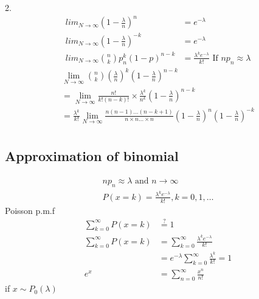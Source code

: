 \documentclass{article}
\begin{document}
2.
\begin{align*}
    lim  _{N \rightarrow \infty} (1-\frac{\lambda}{n}) ^{n}
     & = e ^{-\lambda}                                                           \\
    lim  _{N \rightarrow \infty} (1-\frac{\lambda}{n}) ^{-k}
     & = e ^{-\lambda}                                                           \\
    lim  _{N \rightarrow \infty} \binom{n}{k} p _{n}^{k} (1-p) ^{n-k}
     & = \frac{\lambda ^{k} e ^{- \lambda}}{k!} \text{ If } np_n \approx \lambda
\end{align*}
\begin{gather*}
    \lim _{N \rightarrow \infty} \binom{n}{k} (\frac{\lambda}{n}) ^k (1-\frac{\lambda}{n}) ^{n-k} \\
    =
    \lim _{N \rightarrow \infty} \frac{n!}{k!(n-k)!} \times   \frac{\lambda^k}{n^k} (1-\frac{\lambda}{n}) ^{n-k} \\
    =
    \frac{\lambda^k}{k!} \lim _{N \rightarrow \infty} \frac{n(n-1) \dots (n-k+1)}{n \times n \dots \times n} (1-\frac{\lambda}{n}) ^n (1-\frac{\lambda}{n}) ^{-k} \\
\end{gather*}

\subsection{Approximation of binomial}
\begin{gather*}
    np_n \approx \lambda \text{ and } n \rightarrow \infty \\
    P(x=k) = \frac{\lambda ^{k} e ^{- \lambda}}{k!}, k=0,1,\dots
\end{gather*}
Poisson p.m.f
\begin{align*}
    \sum_{k=0}^{\infty} P(x=k) & \stackrel{?}{=} 1                                               \\
    \sum_{k=0}^{\infty} P(x=k) & = \sum_{k=0}^{\infty} \frac{\lambda ^{k} e ^{- \lambda}}{k!}    \\
                               & = e ^{-\lambda} \sum_{k=0}^{\infty} \frac{\lambda ^{k}}{k!} = 1 \\
    e ^{x}                     & = \sum_{n=0}^{\infty} \frac{x^n}{n!}
\end{align*}
if $x \sim P_0 (\lambda)$
\end{document}
